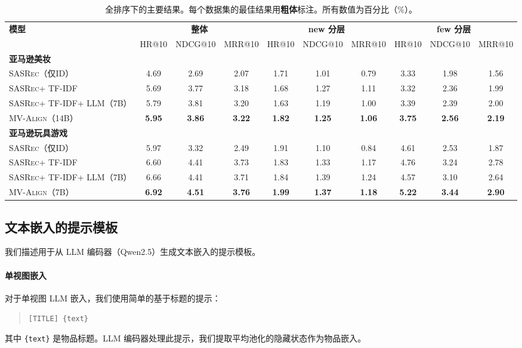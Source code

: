 \documentclass[sigconf,natbib=true]{acmart}
\newcommand{\model}{\textsc{MV-Align}\xspace}
\newcommand{\base}{\textsc{SASRec}\xspace}
\newcommand{\tfidf}{\textsc{TF-IDF}\xspace}
\newcommand{\llm}{\textsc{LLM}\xspace}
\begin{document}
\begin{table}[t]
\caption{全排序下的主要结果。每个数据集的最佳结果用\textbf{粗体}标注。所有数值为百分比（\%）。}
\label{tab:main}
\centering
\small
\begin{tabular}{lccccccccc}
\toprule
\multirow{2}{*}{\textbf{模型}} &
\multicolumn{3}{c}{\textbf{整体}} &
\multicolumn{3}{c}{\textbf{new 分层}} &
\multicolumn{3}{c}{\textbf{few 分层}} \\
\cmidrule(lr){2-4}\cmidrule(lr){5-7}\cmidrule(lr){8-10}
& HR@10 & NDCG@10 & MRR@10 & HR@10 & NDCG@10 & MRR@10 & HR@10 & NDCG@10 & MRR@10 \\
\midrule
\multicolumn{10}{l}{\textbf{亚马逊美妆}} \\
\base（仅ID） & 4.69 & 2.69 & 2.07 & 1.71 & 1.01 & 0.79 & 3.33 & 1.98 & 1.56 \\
\base + \tfidf & 5.69 & 3.77 & 3.18 & 1.68 & 1.27 & 1.11 & 3.32 & 2.36 & 1.99 \\
\base + \tfidf + \llm（7B） & 5.79 & 3.81 & 3.20 & 1.63 & 1.19 & 1.00 & 3.39 & 2.39 & 2.00 \\
\model（14B） & \textbf{5.95} & \textbf{3.86} & \textbf{3.22} & \textbf{1.82} & \textbf{1.25} & \textbf{1.06} & \textbf{3.75} & \textbf{2.56} & \textbf{2.19} \\
\midrule
\multicolumn{10}{l}{\textbf{亚马逊玩具游戏}} \\
\base（仅ID） & 5.97 & 3.32 & 2.49 & 1.91 & 1.10 & 0.84 & 4.61 & 2.53 & 1.87 \\
\base + \tfidf & 6.60 & 4.41 & 3.73 & 1.83 & 1.33 & 1.17 & 4.76 & 3.24 & 2.78 \\
\base + \tfidf + \llm（7B） & 6.66 & 4.41 & 3.71 & 1.84 & 1.39 & 1.24 & 4.57 & 3.10 & 2.64 \\
\model（7B） & \textbf{6.92} & \textbf{4.51} & \textbf{3.76} & \textbf{1.99} & \textbf{1.37} & \textbf{1.18} & \textbf{5.22} & \textbf{3.44} & \textbf{2.90} \\
\bottomrule
\end{tabular}
\end{table}

\subsection{文本嵌入的提示模板}
我们描述用于从 LLM 编码器（Qwen2.5）生成文本嵌入的提示模板。

\paragraph{单视图嵌入}
对于单视图 LLM 嵌入，我们使用简单的基于标题的提示：
\begin{quote}
\texttt{[TITLE] \{text\}}
\end{quote}
其中 \texttt{\{text\}} 是物品标题。LLM 编码器处理此提示，我们提取平均池化的隐藏状态作为物品嵌入。
\end{document}
